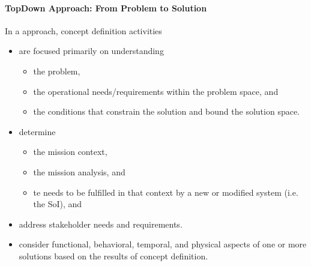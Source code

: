 \documentclass[letterpaper,10pt,english]{jupyterBook}
\begin{document}
\paragraph{Top\sphinxhyphen{}Down Approach: From Problem to Solution}
\label{\detokenize{SE/sebok:top-down-approach-from-problem-to-solution}}
\sphinxAtStartPar
In a  approach, concept definition activities
\begin{itemize}
\item {} 
\sphinxAtStartPar
are focused primarily on understanding
\begin{itemize}
\item {} 
\sphinxAtStartPar
the problem,

\item {} 
\sphinxAtStartPar
the operational needs/requirements within the problem space, and

\item {} 
\sphinxAtStartPar
the conditions that constrain the solution and bound the solution space.

\end{itemize}

\item {} 
\sphinxAtStartPar
determine
\begin{itemize}
\item {} 
\sphinxAtStartPar
the mission context,

\item {} 
\sphinxAtStartPar
the mission analysis, and

\item {} 
\sphinxAtStartPar
te needs to be fulfilled in that context by a new or modified system (i.e. the SoI), and

\end{itemize}

\item {} 
\sphinxAtStartPar
address stakeholder needs and requirements.

\item {} 
\sphinxAtStartPar
consider functional, behavioral, temporal, and physical aspects of one or more solutions based on the results of concept definition.

\end{itemize}
\end{document}
